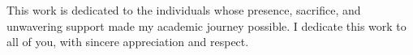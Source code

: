 This work is dedicated to the individuals whose presence, sacrifice, and unwavering support made my academic journey possible.
I dedicate this work to all of you, with sincere appreciation and respect.
